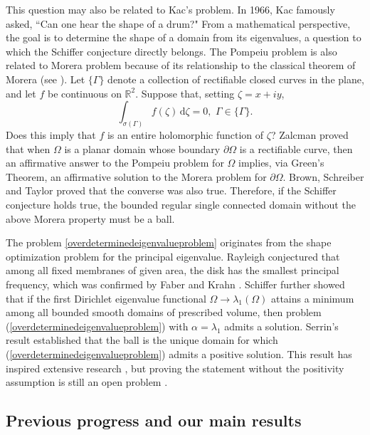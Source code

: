 \documentclass[12pt]{article}
\numberwithin{equation}{section}
\numberwithin{equation}{section}
\begin{document}
This question may also be related to Kac's problem. In 1966, Kac \cite{Kac} famously asked, ``Can one hear the shape of a drum?" From a mathematical perspective, the goal is to determine the shape of a domain from its eigenvalues, a question to which the Schiffer conjecture directly belongs. The Pompeiu problem is also related to Morera problem because of its relationship to the classical theorem of Morera (see \cite{BST}). Let $\{\Gamma\}$ denote a collection of rectifiable
closed curves in the plane, and let $f$ be continuous on $\mathbb{R}^2$. Suppose
that, setting $\zeta = x + iy$,
\begin{equation*}
\int_{\sigma(\Gamma)}f(\zeta)\,\text{d}\zeta=0,\,\,\Gamma\in\{\Gamma\}.
\end{equation*}
Does this imply that $f$ is an entire holomorphic function of $\zeta$? Zalcman \cite{Zalcman1972} proved that when $\Omega$ is a planar domain whose
boundary $\partial\Omega$ is a rectifiable curve, then an affirmative answer to the
Pompeiu problem for $\Omega$ implies, via Green's Theorem, an affirmative
solution to the Morera problem for $\partial\Omega$. Brown, Schreiber and Taylor \cite{BST} proved that the converse was also true. Therefore, if the Schiffer conjecture holds true, the bounded regular single connected domain without the above Morera property must be a ball.

The problem \eqref{overdeterminedeigenvalueproblem} originates from the shape optimization problem for the principal eigenvalue. Rayleigh \cite{Rayleigh} conjectured that among all fixed membranes of given area, the disk has the smallest principal frequency, which was confirmed by Faber \cite{Faber} and Krahn \cite{Krahn, Krahn1}. Schiffer \cite{Schiffer, Schiffer1} further showed that if the first Dirichlet eigenvalue functional $\Omega\to\lambda_1(\Omega)$ attains a minimum among all bounded smooth domains of prescribed volume, then problem (\ref{overdeterminedeigenvalueproblem}) with $\alpha=\lambda_1$ admits a solution. Serrin's result \cite{Serrin, Pucci} established that the ball is the unique domain for which (\ref{overdeterminedeigenvalueproblem}) admits a positive solution. This result has inspired extensive research \cite{Aftalion, BCN, ChenLi, Del, Gidas, Kamburov, Pucci, Reichel, RRS}, but proving the statement without the positivity assumption is still an open problem \cite{Kawohl}.

\subsection{Previous progress and our main results}
\end{document}
